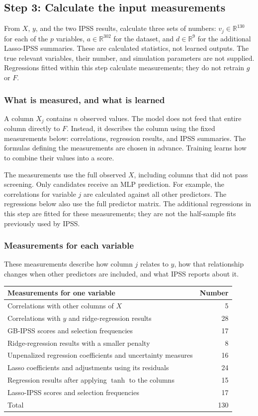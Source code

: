 \documentclass[10pt,letterpaper]{article}
\newcommand{\R}{\mathbb{R}}
\begin{document}
\subsection{Step 3: Calculate the input measurements}\label{sec:inputs}
From $X$, $y$, and the two IPSS results, calculate three sets of
numbers: $v_j\in\R^{130}$ for each of the $p$ variables, $a\in\R^{302}$
for the dataset, and $d\in\R^9$ for the additional Lasso-IPSS
summaries. These are calculated statistics, not learned outputs.
The true relevant variables, their number, and simulation parameters
are not supplied. Regressions fitted within this step calculate
measurements; they do not retrain $g$ or $F$.

\subsubsection{What is measured, and what is learned}
A column $X_j$ contains $n$ observed values. The model does not feed
that entire column directly to $F$. Instead, it describes the column
using the fixed measurements below: correlations, regression results,
and IPSS summaries. The formulas defining the measurements are chosen
in advance. Training learns how to combine their values into a score.

The measurements use the full observed $X$, including columns that did
not pass screening. Only candidates receive an MLP prediction. For example, the correlations for variable $j$
are calculated against all other predictors. The regressions below
also use the full predictor matrix. The additional
regressions in this step are fitted for these measurements; they are
not the half-sample fits previously used by IPSS.

\subsubsection{Measurements for each variable}
These measurements describe how column $j$ relates to $y$, how that
relationship changes when other predictors are included, and what
IPSS reports about it.
\begin{center}\small
\begin{tabularx}{\linewidth}{Lr}
\toprule
Measurements for one variable & Number\\
\midrule
Correlations with other columns of $X$ & 5\\
Correlations with $y$ and ridge-regression results & 28\\
GB-IPSS scores and selection frequencies & 17\\
Ridge-regression results with a smaller penalty & 8\\
Unpenalized regression coefficients and uncertainty measures & 16\\
Lasso coefficients and adjustments using its residuals & 24\\
Regression results after applying $\tanh$ to the columns & 15\\
Lasso-IPSS scores and selection frequencies & 17\\
\midrule
Total & 130\\
\bottomrule
\end{tabularx}
\end{center}
\end{document}
